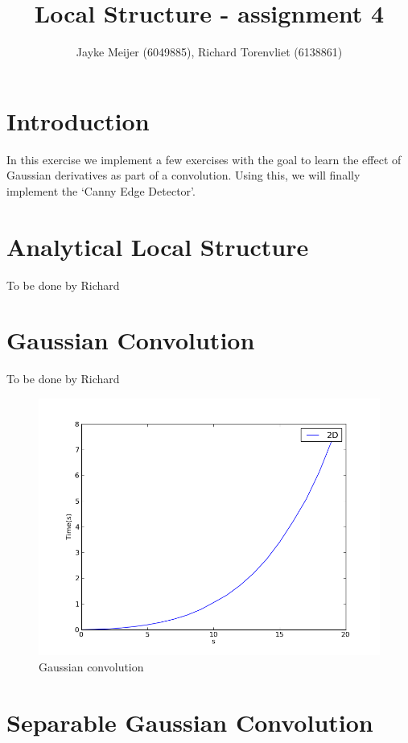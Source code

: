 \documentclass[10pt,a4paper]{article}
\title{Local Structure - assignment 4}
\author{Jayke Meijer (6049885), Richard Torenvliet (6138861)}
\begin{document}
\maketitle

\section{Introduction}

In this exercise we implement a few exercises with the goal to learn 
the effect of Gaussian derivatives as part of a convolution. Using this,
we will finally implement the `Canny Edge Detector'.

\section{Analytical Local Structure}

To be done by Richard

\section{Gaussian Convolution}

To be done by Richard
\begin{figure}[H]
	\includegraphics[scale=0.5]{2d.png}
	\caption{Gaussian convolution}
\end{figure}

\section{Separable Gaussian Convolution}
\end{document}
